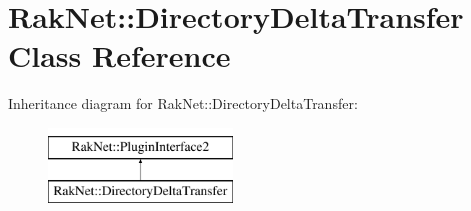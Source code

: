 \hypertarget{class_rak_net_1_1_directory_delta_transfer}{\section{Rak\-Net\-:\-:Directory\-Delta\-Transfer Class Reference}
\label{class_rak_net_1_1_directory_delta_transfer}
}
Inheritance diagram for Rak\-Net\-:\-:Directory\-Delta\-Transfer\-:\begin{figure}[H]
\begin{center}
\leavevmode
\includegraphics[height=2.000000cm]{class_rak_net_1_1_directory_delta_transfer}
\end{center}
\end{figure}
